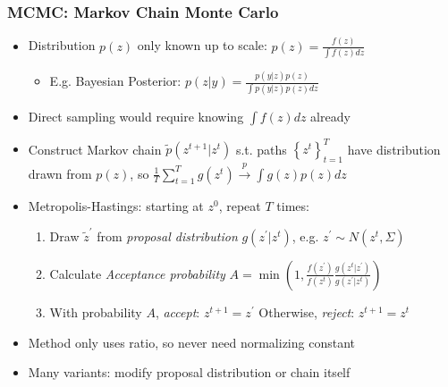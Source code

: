 \documentclass[bigger,handout]{beamer}
\begin{document}
\begin{frame}%

\frametitle{MCMC: Markov Chain Monte Carlo}

\begin{itemize}

\item Distribution $p(z)$ only known up to scale: $p(z)=\frac{f(z)}{\int f(z)dz}$
\begin{itemize}
\item E.g. Bayesian Posterior: $p(z|y)=\frac{p(y|z)p(z)}{\int p(y|z)p(z)dz}$
\end{itemize}
\item Direct sampling would require knowing $\int f(z)dz$ already 



\item Construct Markov chain $\tilde{p}(z^{t+1}|z^{t})$ s.t. paths $\left\{ z^{t}\right\} _{t=1}^{T}$ have distribution drawn from $p(z)$, so $\frac{1}{T}\sum_{t=1}^{T}g(z^t)\overset{p}{\rightarrow}\int g(z)p(z)dz$ 

%

\item Metropolis-Hastings: starting at $z^0$, repeat $T$ times:

\begin{enumerate}
\item Draw $\tilde{z}^{\prime}$ from \emph{proposal distribution} $g(z^{\prime}|z^t)$, e.g. $z^{\prime}\sim N(z^t,\Sigma)$ 

\item Calculate \emph{Acceptance probability} $A=\min(1,\frac{f(z^{\prime})}{f(z^t)}\frac{g(z^t|z^{\prime})}{g(z^{\prime}|z^t)})$

\item With probability $A$, \emph{accept}: $z^{t+1}=z^{\prime}$ \newline
Otherwise, \emph{reject}: $z^{t+1}=z^{t}$
\end{enumerate}
\item Method only uses ratio, so never need normalizing constant
\item Many variants: modify proposal distribution or chain itself


\end{itemize}


\end{frame}%
\end{document}
